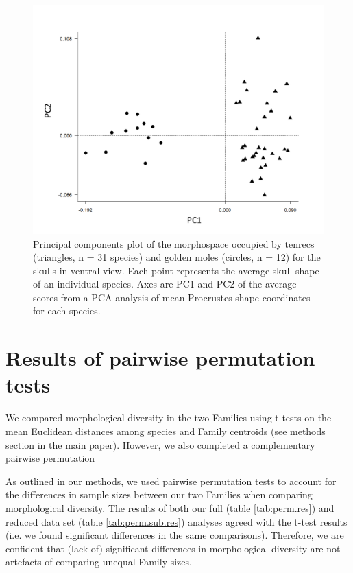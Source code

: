\documentclass[12pt,a4paper]{article}
\begin{document}
	\begin{figure}[H]
	\centering
	\includegraphics[width=1\linewidth]{figures/skvent_PCA_allspecies_BW.png}
	\caption[Morphospace (principal components) plot of morphological diversity in ventral views of tenrec and golden mole skulls.]
		{Principal components plot of the morphospace occupied by tenrecs (triangles, n = 31 species) and golden moles (circles, n = 12) for the skulls in ventral view. Each point represents the average skull shape of an individual species. Axes are PC1 and PC2 of the average scores from a PCA analysis of mean Procrustes shape coordinates for each species.}
	\label{fig:skventPCA}
	\end{figure}
\section{Results of pairwise permutation tests}

	We compared morphological diversity in the two Families using t-tests on the mean Euclidean distances among species and Family centroids (see methods section in the main paper). However, we also completed a complementary pairwise permutation 
	
	As outlined in our methods, we used pairwise permutation tests to account for the differences in sample sizes between our two Families when comparing morphological diversity. The results of both our full (table \ref{tab:perm.res}) and reduced data set (table \ref{tab:perm.sub.res}) analyses agreed with the t-test results (i.e. we found significant differences in the same comparisons). Therefore, we are confident that (lack of) significant differences in morphological diversity are not artefacts of comparing unequal Family sizes.
\end{document}
